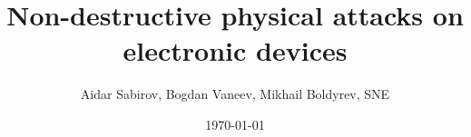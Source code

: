 \documentclass[a4paper]{article}
\begin{document}
\title{Non-destructive physical attacks on electronic devices}
\author{Aidar Sabirov, Bogdan Vaneev, Mikhail Boldyrev, SNE}
\date{\today}

\maketitle
\tableofcontents
\listoffigures
\newpage





\end{document}
